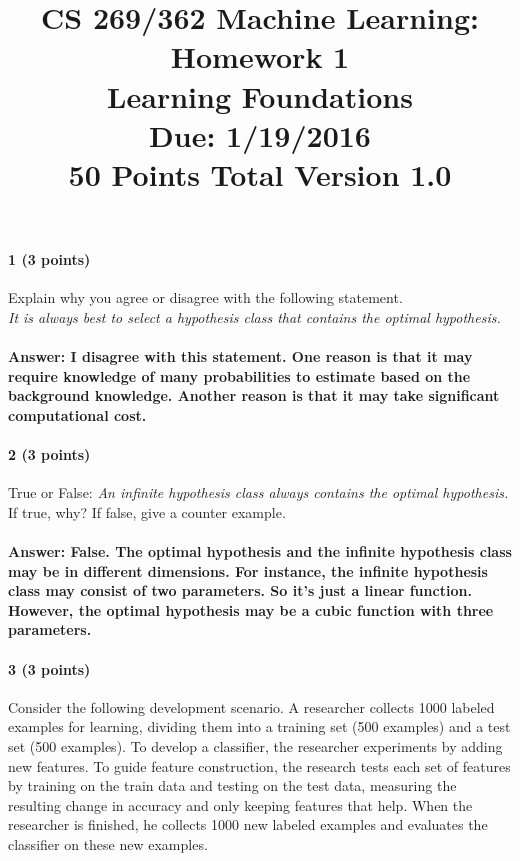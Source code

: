 \documentclass[11pt]{article}
\title{CS 269/362 Machine Learning: Homework 1\\Learning Foundations\\
\Large{Due: 1/19/2016}\\
50 Points Total \hspace{1cm} Version 1.0}
\author{}
\date{}
\begin{document}
\large
\maketitle
\thispagestyle{headings}

\vspace{-.5in}

\paragraph{1 (3 points)} Explain why you agree or disagree with the following statement.\\
{\it It is always best to select a hypothesis class that contains the optimal hypothesis.}
\paragraph{\textbf{Answer: }I disagree with this statement. One reason is that it may require knowledge of many probabilities to estimate based on the background knowledge. Another reason is that it may take significant computational cost. 
}
\paragraph{2 (3 points)} True or False: {\it An infinite hypothesis class always contains the optimal hypothesis.} If true, why? If false, give a counter example.
\paragraph{\textbf{Answer:} False. The optimal hypothesis and the infinite hypothesis class may be in different dimensions. For instance, the infinite hypothesis class may consist of two parameters. So it's just a linear function. However, the optimal hypothesis may be a cubic function with three parameters.
}

\paragraph{3 (3 points)} Consider the following development scenario. A researcher collects 1000 labeled examples for learning, dividing them into a training set (500 examples) and a test set (500 examples). To develop a classifier, the researcher experiments by adding new features. To guide feature construction, the research tests each set of features by training on the train data and testing on the test data, measuring the resulting change in accuracy and only keeping features that help. When the researcher is finished, he collects 1000 new labeled examples and evaluates the classifier on these new examples.
\end{document}
